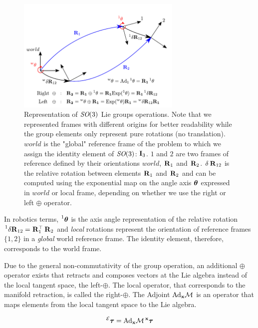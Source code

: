\begin{figure}[h]
    \centering    \includegraphics[width=0.7\textwidth]{figures/rotation_exp_log.pdf}
    \caption{Representation of $\textit{SO}(3)$ Lie groups operations. Note that we represented frames with different origins
    for better readability while the group elements only represent pure rotations (no translation). $world$ is the "global" reference 
    frame of the problem to which we assign the identity element of $\textit{SO}(3)$: ${\bf I}_3$. $1$ and $2$ are two frames of reference
    defined by their orientations \wrt $world$, $\prescript{}{}{{\bf R}}_{1}$ and $\prescript{}{}{{\bf R}}_{2}$. $\delta \prescript{}{}{{\bf R}}_{12}$ is the relative rotation
    between elements $\prescript{}{}{{\bf R}}_{1}$ and $\prescript{}{}{{\bf R}}_{2}$ and can be computed using the exponential map on the angle axis ${\bm \theta}$ expressed
    in $world$ or local frame, depending on whether we use the right or left $\oplus$ operator.}
    \label{fig:rotation_exp_log} 
\end{figure}

In robotics terms, $\prescript{1}{}{{\bm \theta}}$ is the axis angle representation of the relative rotation $\prescript{1}{}{\delta {\bf R}}_{12} = \prescript{}{}{{\bf R}}_{1}^{\top}\prescript{}{}{{\bf R}}_{2}$ and
\textit{local} rotations represent the orientation of reference frames $\{1,2\}$ in a \textit{global} world reference frame. The identity element, therefore, corresponds 
to the world frame. 

Due to the general non-commutativity of the group operation, an additional $\oplus$ operator exists that retracts and composes vectors at the Lie algebra instead of
the local tangent space, the left-$\oplus$. The local operator, that corresponds to the manifold retraction, is called the right-$\oplus$. 
The Adjoint $\text{Ad}_{{\bf x}}\mathcal{M}$ is an operator that maps elements from the local tangent space to the Lie algebra. 

\begin{equation}
    \prescript{\mathcal{E}}{}{{\bm \tau}} = \text{Ad}_{{\bf x}}\mathcal{M} \prescript{{\bf x}}{}{{\bm \tau}} 
\end{equation}

